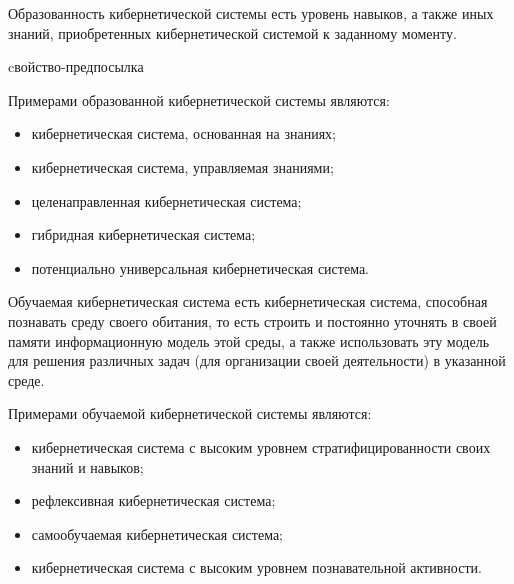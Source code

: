 Образованность кибернетической системы есть уровень навыков, а также иных знаний, приобретенных кибернетической системой к заданному моменту. 

\begin{SCn}
\begin{scnrelfromlist}{cвойство-предпосылка}
\end{scnrelfromlist}
\end{SCn}

Примерами образованной кибернетической системы являются:
\begin{itemize}
    \item{кибернетическая система, основанная на знаниях;}
    \item{кибернетическая система, управляемая знаниями;}
    \item{целенаправленная кибернетическая система;}
    \item{гибридная кибернетическая система;}
    \item{потенциально универсальная кибернетическая система.}
\end{itemize}

Обучаемая кибернетическая система есть кибернетическая система, способная познавать среду своего обитания, то есть строить и постоянно уточнять в своей памяти информационную модель этой среды, а также использовать эту модель для решения различных задач (для организации своей деятельности) в указанной среде. 

Примерами обучаемой кибернетической системы являются:
\begin{itemize}
    \item{кибернетическая система с высоким уровнем стратифицированности своих знаний и навыков;}
    \item{рефлексивная кибернетическая система;}
    \item{самообучаемая кибернетическая система;}
    \item{кибернетическая система с высоким уровнем познавательной активности.}
\end{itemize}

